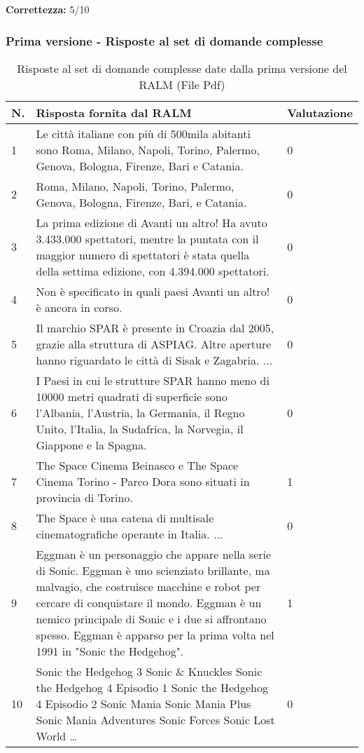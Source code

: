 \textbf{Correttezza:} 5/10

\subsubsection{Prima versione - Risposte al set di domande complesse}

\begin{table}[H]
    \centering
    \begin{tabular}{|p{0.5cm} |p{6cm} |p{2cm}|}
        \hline
        \textbf{N}. & \textbf{Risposta fornita dal RALM} & \textbf{Valutazione} \\
        \hline
        1 & Le città italiane con più di 500mila abitanti sono Roma, Milano, Napoli, Torino, Palermo, Genova, Bologna, Firenze, Bari e Catania. & 0 \\
        \hline
        2 & Roma, Milano, Napoli, Torino, Palermo, Genova, Bologna, Firenze, Bari, e Catania. & 0 \\
        \hline
        3 & La prima edizione di Avanti un altro! Ha avuto 3.433.000 spettatori, mentre la puntata con il maggior numero di spettatori è stata quella della settima edizione, con 4.394.000 spettatori. & 0 \\
        \hline
        4 & Non è specificato in quali paesi Avanti un altro! è ancora in corso. & 0 \\
        \hline
        5 & Il marchio SPAR è presente in Croazia dal 2005, grazie alla struttura di ASPIAG. Altre aperture hanno riguardato le città di Sisak e Zagabria. ... & 0 \\
        \hline
        6 & I Paesi in cui le strutture SPAR hanno meno di 10000 metri quadrati di superficie sono l'Albania, l'Austria, la Germania, il Regno Unito, l'Italia, la Sudafrica, la Norvegia, il Giappone e la Spagna. & 0 \\
        \hline
        7 & The Space Cinema Beinasco e The Space Cinema Torino - Parco Dora sono situati in provincia di Torino. & 1 \\
        \hline
        8 & The Space è una catena di multisale cinematografiche operante in Italia. ... & 0 \\
        \hline
        9 & Eggman è un personaggio che appare nella serie di Sonic. Eggman è uno scienziato brillante, ma malvagio, che costruisce macchine e robot per cercare di conquistare il mondo. Eggman è un nemico principale di Sonic e i due si affrontano spesso. Eggman è apparso per la prima volta nel 1991 in "Sonic the Hedgehog". & 1 \\
        \hline
        10 & Sonic the Hedgehog 3
        Sonic \& Knuckles
        Sonic the Hedgehog 4 Episodio 1
        Sonic the Hedgehog 4 Episodio 2
        Sonic Mania
        Sonic Mania Plus
        Sonic Mania Adventures
        Sonic Forces
        Sonic Lost World
        \dots & 0 \\
        \hline
    \end{tabular}
    \caption{Risposte al set di domande complesse date dalla prima versione del RALM (File Pdf)}
\end{table}

